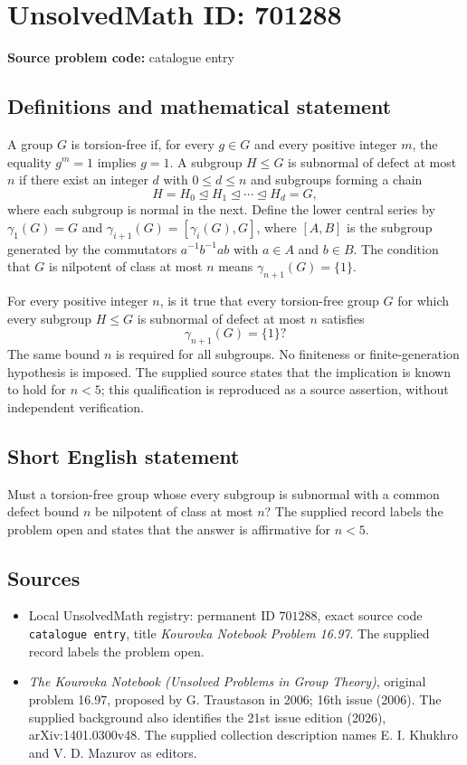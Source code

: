 \documentclass[11pt]{article}
\begin{document}
\section*{UnsolvedMath ID: 701288}
\textbf{Source problem code:} catalogue entry
\subsection{Definitions and mathematical statement}
A group \(G\) is torsion-free if, for every \(g\in G\) and every positive integer \(m\), the equality \(g^m=1\) implies \(g=1\). A subgroup \(H\leq G\) is subnormal of defect at most \(n\) if there exist an integer \(d\) with \(0\leq d\leq n\) and subgroups forming a chain
\[
H=H_0\trianglelefteq H_1\trianglelefteq\cdots\trianglelefteq H_d=G,
\]
where each subgroup is normal in the next. Define the lower central series by \(\gamma_1(G)=G\) and \(\gamma_{i+1}(G)=[\gamma_i(G),G]\), where \([A,B]\) is the subgroup generated by the commutators \(a^{-1}b^{-1}ab\) with \(a\in A\) and \(b\in B\). The condition that \(G\) is nilpotent of class at most \(n\) means \(\gamma_{n+1}(G)=\{1\}\).

For every positive integer \(n\), is it true that every torsion-free group \(G\) for which every subgroup \(H\leq G\) is subnormal of defect at most \(n\) satisfies
\[
\gamma_{n+1}(G)=\{1\}?
\]
The same bound \(n\) is required for all subgroups. No finiteness or finite-generation hypothesis is imposed. The supplied source states that the implication is known to hold for \(n<5\); this qualification is reproduced as a source assertion, without independent verification.
\subsection{Short English statement}
Must a torsion-free group whose every subgroup is subnormal with a common defect bound \(n\) be nilpotent of class at most \(n\)? The supplied record labels the problem open and states that the answer is affirmative for \(n<5\).
\subsection{Sources}
\begin{itemize}
\item Local UnsolvedMath registry: permanent ID \(701288\), exact source code \texttt{catalogue entry}, title \emph{Kourovka Notebook Problem 16.97}. The supplied record labels the problem open.
\item \emph{The Kourovka Notebook (Unsolved Problems in Group Theory)}, original problem 16.97, proposed by G. Traustason in 2006; 16th issue (2006). The supplied background also identifies the 21st issue edition (2026), arXiv:1401.0300v48. The supplied collection description names E. I. Khukhro and V. D. Mazurov as editors.
\end{itemize}
\end{document}
